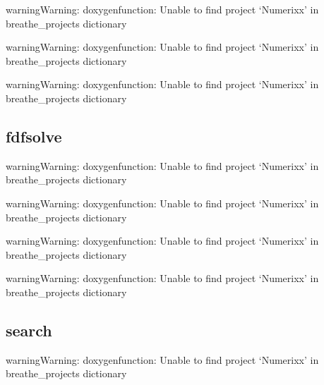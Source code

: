 \documentclass[letterpaper,10pt,english]{sphinxmanual}
\begin{document}
\begin{sphinxadmonition}{warning}{Warning:}
\sphinxAtStartPar
doxygenfunction: Unable to find project ‘Numerixx’ in breathe\_projects dictionary
\end{sphinxadmonition}

\begin{sphinxadmonition}{warning}{Warning:}
\sphinxAtStartPar
doxygenfunction: Unable to find project ‘Numerixx’ in breathe\_projects dictionary
\end{sphinxadmonition}

\begin{sphinxadmonition}{warning}{Warning:}
\sphinxAtStartPar
doxygenfunction: Unable to find project ‘Numerixx’ in breathe\_projects dictionary
\end{sphinxadmonition}


\subsection{fdfsolve}
\label{\detokenize{docRoots:fdfsolve}}
\begin{sphinxadmonition}{warning}{Warning:}
\sphinxAtStartPar
doxygenfunction: Unable to find project ‘Numerixx’ in breathe\_projects dictionary
\end{sphinxadmonition}

\begin{sphinxadmonition}{warning}{Warning:}
\sphinxAtStartPar
doxygenfunction: Unable to find project ‘Numerixx’ in breathe\_projects dictionary
\end{sphinxadmonition}

\begin{sphinxadmonition}{warning}{Warning:}
\sphinxAtStartPar
doxygenfunction: Unable to find project ‘Numerixx’ in breathe\_projects dictionary
\end{sphinxadmonition}

\begin{sphinxadmonition}{warning}{Warning:}
\sphinxAtStartPar
doxygenfunction: Unable to find project ‘Numerixx’ in breathe\_projects dictionary
\end{sphinxadmonition}


\subsection{search}
\label{\detokenize{docRoots:search}}
\begin{sphinxadmonition}{warning}{Warning:}
\sphinxAtStartPar
doxygenfunction: Unable to find project ‘Numerixx’ in breathe\_projects dictionary
\end{sphinxadmonition}
\end{document}
